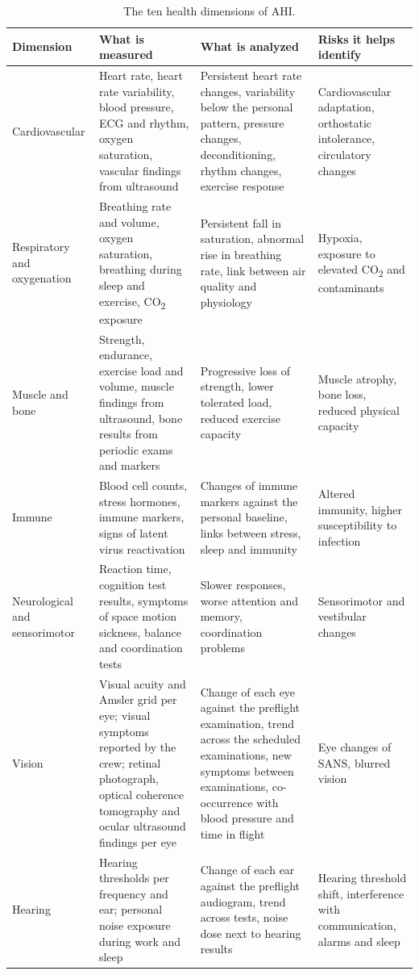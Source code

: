 \begin{table}[htbp]
\centering
\vspace{0.8em}
\caption{The ten health dimensions of AHI.}
\label{tab:dimensions}
\scriptsize
\begin{tabular}{p{2.3cm}p{4.0cm}p{4.2cm}p{3.5cm}}
\hline
\textbf{Dimension} & \textbf{What is measured} & \textbf{What is analyzed} & \textbf{Risks it helps identify} \\
\hline
Cardiovascular & Heart rate, heart rate variability, blood pressure, ECG and rhythm, oxygen saturation, vascular findings from ultrasound & Persistent heart rate changes, variability below the personal pattern, pressure changes, deconditioning, rhythm changes, exercise response & Cardiovascular adaptation, orthostatic intolerance, circulatory changes \\
Respiratory and oxygenation & Breathing rate and volume, oxygen saturation, breathing during sleep and exercise, CO\textsubscript{2} exposure & Persistent fall in saturation, abnormal rise in breathing rate, link between air quality and physiology & Hypoxia, exposure to elevated CO\textsubscript{2} and contaminants \\
Muscle and bone & Strength, endurance, exercise load and volume, muscle findings from ultrasound, bone results from periodic exams and markers & Progressive loss of strength, lower tolerated load, reduced exercise capacity & Muscle atrophy, bone loss, reduced physical capacity \\
Immune & Blood cell counts, stress hormones, immune markers, signs of latent virus reactivation & Changes of immune markers against the personal baseline, links between stress, sleep and immunity & Altered immunity, higher susceptibility to infection \\
Neurological and sensorimotor & Reaction time, cognition test results, symptoms of space motion sickness, balance and coordination tests & Slower responses, worse attention and memory, coordination problems & Sensorimotor and vestibular changes \\
Vision & Visual acuity and Amsler grid per eye; visual symptoms reported by the crew; retinal photograph, optical coherence tomography and ocular ultrasound findings per eye & Change of each eye against the preflight examination, trend across the scheduled examinations, new symptoms between examinations, co-occurrence with blood pressure and time in flight & Eye changes of SANS, blurred vision \\
Hearing & Hearing thresholds per frequency and ear; personal noise exposure during work and sleep & Change of each ear against the preflight audiogram, trend across tests, noise dose next to hearing results & Hearing threshold shift, interference with communication, alarms and sleep \\

\end{tabular}
\end{table}
